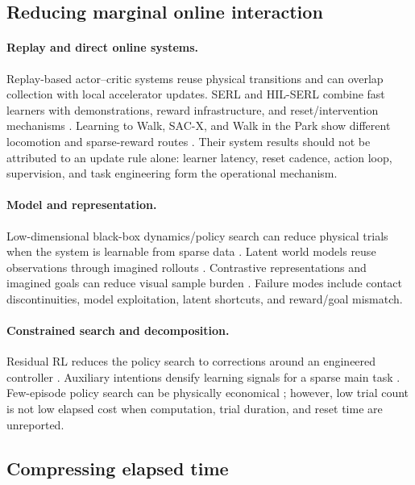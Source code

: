 \documentclass[11pt]{article}
\begin{document}
\subsection{Reducing marginal online interaction}

\paragraph{Replay and direct online systems.}
Replay-based actor--critic systems reuse physical transitions and can overlap collection with local accelerator updates. SERL and HIL-SERL combine fast learners with demonstrations, reward infrastructure, and reset/intervention mechanisms \cite{luo2024serl,luo2025hilserl}. Learning to Walk, SAC-X, and Walk in the Park show different locomotion and sparse-reward routes \cite{haarnoja2019walk,riedmiller2018sacx,wurss2023locality}. Their system results should not be attributed to an update rule alone: learner latency, reset cadence, action loop, supervision, and task engineering form the operational mechanism.

\paragraph{Model and representation.}
Low-dimensional black-box dynamics/policy search can reduce physical trials when the system is learnable from sparse data \cite{yang2020dataefficientlegged,chatzilygeroudis2017blackdrops}. Latent world models reuse observations through imagined rollouts \cite{wu2023daydreamer,lancaster2024modemv2}. Contrastive representations and imagined goals can reduce visual sample burden \cite{zhan2022ferm,nair2018rig}. Failure modes include contact discontinuities, model exploitation, latent shortcuts, and reward/goal mismatch.

\paragraph{Constrained search and decomposition.}
Residual RL reduces the policy search to corrections around an engineered controller \cite{johannink2019residual}. Auxiliary intentions densify learning signals for a sparse main task \cite{riedmiller2018sacx}. Few-episode policy search can be physically economical \cite{tebbe2021tabletennis,chatzilygeroudis2017blackdrops}; however, low trial count is not low elapsed cost when computation, trial duration, and reset time are unreported.

\subsection{Compressing elapsed time}
\end{document}
